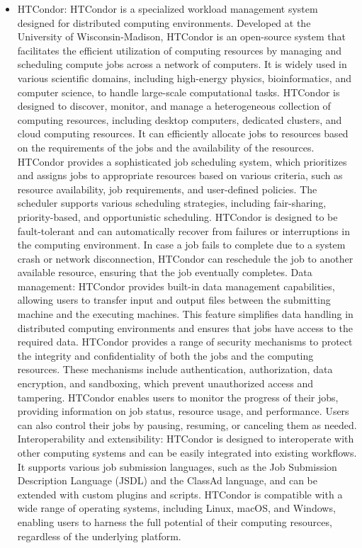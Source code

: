 \begin{itemize}
\item HTCondor: HTCondor is a specialized workload management system designed for distributed computing environments. Developed at the University of Wisconsin-Madison, HTCondor is an open-source system that facilitates the efficient utilization of computing resources by managing and scheduling compute jobs across a network of computers. It is widely used in various scientific domains, including high-energy physics, bioinformatics, and computer science, to handle large-scale computational tasks. HTCondor is designed to discover, monitor, and manage a heterogeneous collection of computing resources, including desktop computers, dedicated clusters, and cloud computing resources. It can efficiently allocate jobs to resources based on the requirements of the jobs and the availability of the resources. HTCondor provides a sophisticated job scheduling system, which prioritizes and assigns jobs to appropriate resources based on various criteria, such as resource availability, job requirements, and user-defined policies. The scheduler supports various scheduling strategies, including fair-sharing, priority-based, and opportunistic scheduling. HTCondor is designed to be fault-tolerant and can automatically recover from failures or interruptions in the computing environment. In case a job fails to complete due to a system crash or network disconnection, HTCondor can reschedule the job to another available resource, ensuring that the job eventually completes. Data management: HTCondor provides built-in data management capabilities, allowing users to transfer input and output files between the submitting machine and the executing machines. This feature simplifies data handling in distributed computing environments and ensures that jobs have access to the required data. HTCondor provides a range of security mechanisms to protect the integrity and confidentiality of both the jobs and the computing resources. These mechanisms include authentication, authorization, data encryption, and sandboxing, which prevent unauthorized access and tampering. HTCondor enables users to monitor the progress of their jobs, providing information on job status, resource usage, and performance. Users can also control their jobs by pausing, resuming, or canceling them as needed. Interoperability and extensibility: HTCondor is designed to interoperate with other computing systems and can be easily integrated into existing workflows. It supports various job submission languages, such as the Job Submission Description Language (JSDL) and the ClassAd language, and can be extended with custom plugins and scripts. HTCondor is compatible with a wide range of operating systems, including Linux, macOS, and Windows, enabling users to harness the full potential of their computing resources, regardless of the underlying platform.


\end{itemize}
